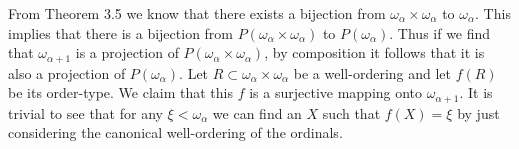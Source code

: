 \begin{solution}
  From Theorem 3.5 we know that there exists a bijection from $\omega_{\alpha} \times \omega_{\alpha}$ to $\omega_{\alpha}$.
  This implies that there is a bijection from $P(\omega_{\alpha} \times \omega_{\alpha})$ to $P(\omega_{\alpha})$.
  Thus if we find that $\omega_{\alpha + 1}$ is a projection of $P(\omega_{\alpha} \times \omega_{\alpha})$, by composition it follows that it is also a projection of $P(\omega_{\alpha})$.
  Let $R \subset \omega_{\alpha} \times \omega_{\alpha}$ be a well-ordering and let $f(R)$ be its order-type.
  We claim that this $f$ is a surjective mapping onto $\omega_{\alpha + 1}$.
  It is trivial to see that for any $\xi < \omega_{\alpha}$ we can find an $X$ such that $f(X) = \xi$ by just considering the canonical well-ordering of the ordinals.
\end{solution}


%
%

